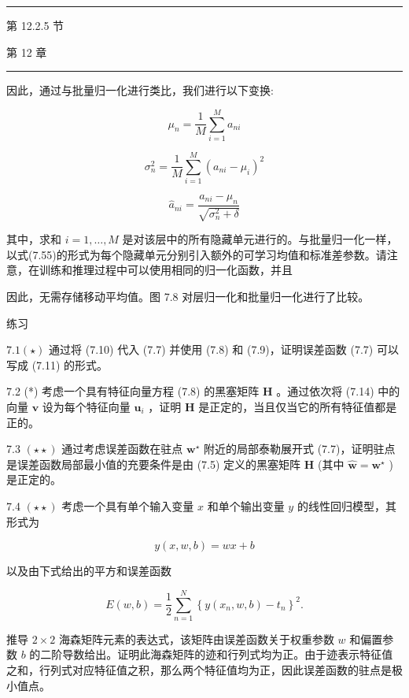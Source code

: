 \documentclass[10pt]{report}
\newcommand{\HRule}{\begin{center}\rule{0.9\linewidth}{0.2mm}\end{center}}
\begin{document}
\HRule

第 12.2.5 节

第 12 章

\HRule

因此，通过与批量归一化进行类比，我们进行以下变换:

\[
{\mu }_{n} = \frac{1}{M}\mathop{\sum }\limits_{{i = 1}}^{M}{a}_{ni} \tag{7.58}
\]

\[
{\sigma }_{n}^{2} = \frac{1}{M}\mathop{\sum }\limits_{{i = 1}}^{M}{\left( {a}_{ni} - {\mu }_{i}\right) }^{2} \tag{7.59}
\]

\[
{\widehat{a}}_{ni} = \frac{{a}_{ni} - {\mu }_{n}}{\sqrt{{\sigma }_{n}^{2} + \delta }} \tag{7.60}
\]

其中，求和 \(i = 1,\ldots ,M\) 是对该层中的所有隐藏单元进行的。与批量归一化一样，以式(7.55)的形式为每个隐藏单元分别引入额外的可学习均值和标准差参数。请注意，在训练和推理过程中可以使用相同的归一化函数，并且

因此，无需存储移动平均值。图 7.8 对层归一化和批量归一化进行了比较。

练习

\({7.1}\left( \star \right)\) 通过将 (7.10) 代入 (7.7) 并使用 (7.8) 和 (7.9)，证明误差函数 (7.7) 可以写成 (7.11) 的形式。

7.2 (*) 考虑一个具有特征向量方程 (7.8) 的黑塞矩阵 \(\mathbf{H}\) 。通过依次将 (7.14) 中的向量 \(\mathbf{v}\) 设为每个特征向量 \({\mathbf{u}}_{i}\) ，证明 \(\mathbf{H}\) 是正定的，当且仅当它的所有特征值都是正的。

7.3 \(\left( {\star  \star  }\right)\) 通过考虑误差函数在驻点 \({\mathbf{w}}^{ \star  }\) 附近的局部泰勒展开式 (7.7)，证明驻点是误差函数局部最小值的充要条件是由 (7.5) 定义的黑塞矩阵 \(\mathbf{H}\) (其中 \(\widehat{\mathbf{w}} = {\mathbf{w}}^{ \star  }\) )是正定的。

7.4 \(\left( {\star  \star  }\right)\) 考虑一个具有单个输入变量 \(x\) 和单个输出变量 \(y\) 的线性回归模型，其形式为

\[
y\left( {x,w,b}\right)  = {wx} + b \tag{7.61}
\]

以及由下式给出的平方和误差函数

\[
E\left( {w,b}\right)  = \frac{1}{2}\mathop{\sum }\limits_{{n = 1}}^{N}{\left\{  y\left( {x}_{n},w,b\right)  - {t}_{n}\right\}  }^{2}. \tag{7.62}
\]

推导 \(2 \times  2\) 海森矩阵元素的表达式，该矩阵由误差函数关于权重参数 \(w\) 和偏置参数 \(b\) 的二阶导数给出。证明此海森矩阵的迹和行列式均为正。由于迹表示特征值之和，行列式对应特征值之积，那么两个特征值均为正，因此误差函数的驻点是极小值点。
\end{document}
